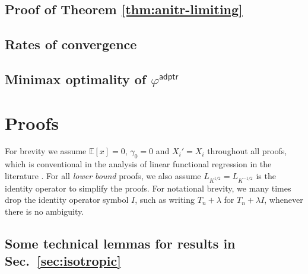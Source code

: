 \documentclass[11pt,a4paper]{article}
\theoremstyle{definition}
\theoremstyle{plain}
\theoremstyle{remark}
\newcommand{\mH}{\mathcal H}
\newcommand{\adptr}{\mathsf{adptr}}
\begin{document}
\subsection{Proof of Theorem \ref{thm:anitr-limiting}}

\subsection{Rates of convergence}

 
\subsection{Minimax optimality of $\varphi^{\adptr}$}


\section{Proofs}

For brevity we assume $\mathbb E[x]=0$, $\gamma_0=0$ and $X_i'=X_i$ throughout all proofs, which is conventional in the analysis of linear functional regression in the literature \citep{cai2012minimax,yuan2010reproducing}.
For all \emph{lower bound} proofs, we also assume $L_{K^{1/2}}=L_{K^{-1/2}}$ is the identity operator to simplify the proofs.
For notational brevity, we many times drop the identity operator symbol $I$, such as writing $T_n+\lambda$ for $T_n+\lambda I$, whenever there is no ambiguity.



\subsection{Some technical lemmas for results in Sec.~\ref{sec:isotropic}}
\end{document}
